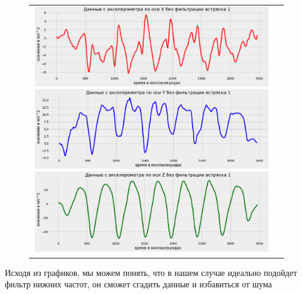\begin{figure}[H]
    \begin{center}
        \begin{tabular}{cc}
            \includegraphics[width=1\textwidth]{farim/shakeeee.png} & 
        \end{tabular}
    \end{center}
\end{figure}
Исходя из графиков, мы можем понять, 
что в нашем случае идеально подойдет фильтр нижних частот, 
он сможет сгадить данные и избавиться от шума
